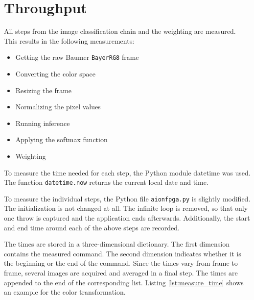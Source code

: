 \section{Throughput}
\label{sec:verification_and_benchmark:throughput}

All steps from the image classification chain and the weighting are measured.
This results in the following measurements:
\begin{itemize}
  \item Getting the raw Baumer \texttt{BayerRG8} frame
  \item Converting the color space
  \item Resizing the frame
  \item Normalizing the pixel values
  \item Running inference
  \item Applying the softmax function
  \item Weighting
\end{itemize}

To measure the time needed for each step, the Python module datetime was used.
The function \texttt{datetime.now} returns the current local date and time.

To measure the individual steps, the Python file \texttt{aionfpga.py} is slightly modified.
The initialization is not changed at all.
The infinite loop is removed, so that only one throw is captured and the application ends afterwards.
Additionally, the start and end time around each of the above steps are recorded.

The times are stored in a three-dimensional dictionary.
The first dimension contains the measured command.
The second dimension indicates whether it is the beginning or the end of the command.
Since the times vary from frame to frame, several images are acquired and averaged in a final step.
The times are appended to the end of the corresponding list.
Listing \ref{lst:measure_time} shows an example for the color transformation.

